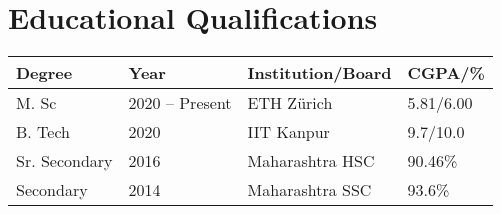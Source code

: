 \section*{Educational Qualifications}
\begin{tabulary}{\textwidth}{L L L L}

\toprule
\textbf{Degree} & \textbf{Year} & \textbf{Institution/Board} & \textbf{CGPA/\%}\\
\midrule
M. Sc & 2020 -- Present & ETH Zürich & 5.81/6.00\\%
B. Tech & 2020 & IIT Kanpur & 9.7/10.0\\
Sr. Secondary & 2016 & Maharashtra HSC & 90.46\%\\
Secondary & 2014 & Maharashtra SSC & 93.6\%\\
\bottomrule

\end{tabulary}
